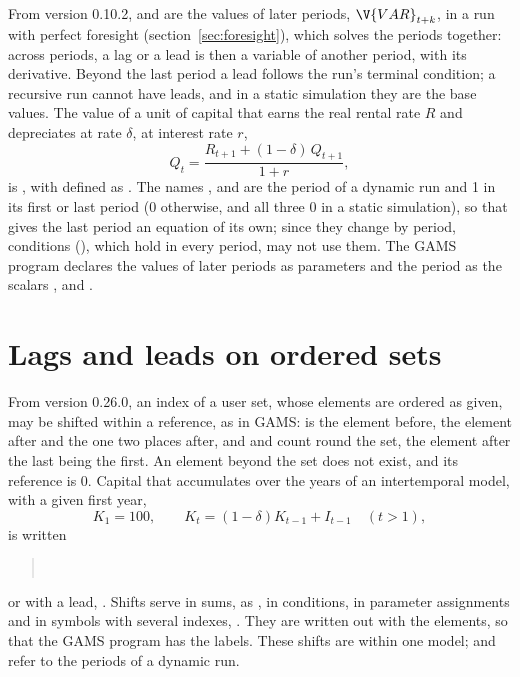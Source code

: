 From version 0.10.2,  and  are the values
of later periods, $\V{VAR}_{t+k}$, in a run with perfect foresight
(section~\ref{sec:foresight}), which solves the periods together: across
periods, a lag or a lead is then a variable of another period, with its
derivative. Beyond the last period a lead follows the run's terminal
condition; a recursive run cannot have leads, and in a static simulation they
are the base values. The value of a unit of capital that earns the real
rental rate $R$ and depreciates at rate $\delta$, at interest rate $r$,
\begin{equation*}
Q_t = \frac{R_{t+1} + (1 - \delta)\,Q_{t+1}}{1 + r},
\end{equation*}
is , with
 defined as . The names , 
and  are the period of a dynamic run and 1 in its first or last
period (0 otherwise, and all three 0 in a static simulation), so that
 gives the last period an equation of its own;
since they change by period, conditions (\cmd{$}), which hold in every
period, may not use them. The GAMS program declares the values of later
periods as parameters  and the period as the scalars
,  and .

\section{Lags and leads on ordered sets}\label{sec:userindexlags}

From version 0.26.0, an index of a user set, whose elements are ordered as
given, may be shifted within a reference, as in GAMS:  is the
element before,  the element after and  the one two
places after, and  and  count round the set, the
element after the last being the first. An element beyond the set does not
exist, and its reference is 0. Capital that accumulates over the years of
an intertemporal model, with a given first year,
\begin{equation*}
K_1 = 100, \qquad K_t = (1 - \delta) K_{t-1} + I_{t-1} \quad (t > 1),
\end{equation*}
is written
\begin{quote}
\\
\end{quote}
or with a lead, .
Shifts serve in sums, as , in
conditions, in parameter assignments and in symbols with several indexes,
. They are written out with the elements, so that the GAMS
program has the labels. These shifts are within one model;  and
 refer to the periods of a dynamic run.

